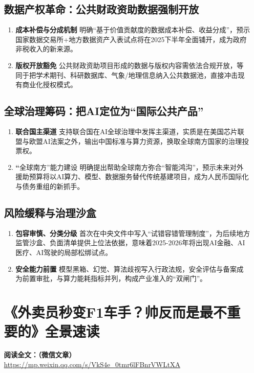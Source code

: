 \subsection{数据产权革命：公共财政资助数据强制开放}
\begin{enumerate}[leftmargin=*, nosep]
    \item \textbf{成本补偿与分成机制}  
    明确“基于价值贡献度的数据成本补偿、收益分成”，预示国家数据交易所+地方数据资产入表试点将在2025下半年全面铺开，成为政府非税收入的新来源。
    \item \textbf{版权开放豁免}  
    公共财政资助项目形成的数据与版权内容需依法合规开放，等同于把学术期刊、科研数据库、气象/地理信息纳入公共数据池，直接冲击现有商业化授权模式。
\end{enumerate}

\subsection{全球治理筹码：把AI定位为“国际公共产品”}
\begin{enumerate}[leftmargin=*, nosep]
    \item \textbf{联合国主渠道}  
    支持联合国在AI全球治理中发挥主渠道，实质是在美国芯片联盟与欧盟AI法案之外，输出中国标准与算力资源，换取全球南方国家的治理投票权。  
    \item \textbf“全球南方”能力建设  
    明确提出帮助全球南方弥合“智能鸿沟”，预示未来对外援助预算将以AI算力、模型、数据服务替代传统基建项目，成为人民币国际化与债务重组的新抓手。
\end{enumerate}

\subsection{风险缓释与治理沙盒}
\begin{enumerate}[leftmargin=*, nosep]
    \item \textbf{包容审慎、分类分级}  
    首次在中央文件中写入“试错容错管理制度”，为后续地方监管沙盒、负面清单提供上位法依据，意味着2025-2026年将出现AI金融、AI医疗、AI驾驶的局部松绑试点。  
    \item \textbf{安全能力前置}  
    模型黑箱、幻觉、算法歧视写入行政法规，安全评估与备案成为前置审批，与算力能耗指标并列，构成产业准入的“双闸门”。
\end{enumerate}


\section{《外卖员秒变F1车手？帅反而是最不重要的》全景速读}
\vspace{1cm}
\noindent\textbf{阅读全文：（微信文章）} \url{https://mp.weixin.qq.com/s/VkS4e_0tmr6lFBnrVWLtXA}

